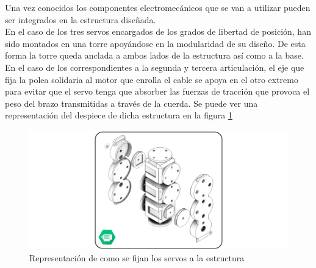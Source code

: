    Una vez conocidos los componentes electromecánicos que se van a utilizar pueden ser integrados en la estructura diseñada.
    \\

    En el caso de los tres servos encargados de los grados de libertad de posición, han sido montados en una torre apoyándose en la modularidad de su diseño. De esta forma la torre queda anclada a ambos lados de la estructura así como a la base.
    \\

    En el caso de los correspondientes a la segunda y tercera articulación, el eje que fija la polea solidaria al motor que enrolla el cable se apoya en el otro extremo para evitar que el servo tenga que absorber las fuerzas de tracción que provoca el peso del brazo transmitidas a través de la cuerda. Se puede ver una representación del despiece de dicha estructura en la figura \ref{fig:Electronica:montaje_servos}

   	\begin{figure}[H]
   		\centering
   		\includegraphics[width=\textwidth]{figuras/Imagenes_Electronica/anclaje_servos.jpg}
   		\caption{Representación de como se fijan los servos a la estructura}
   		\label{fig:Electronica:montaje_servos}
   	\end{figure}

